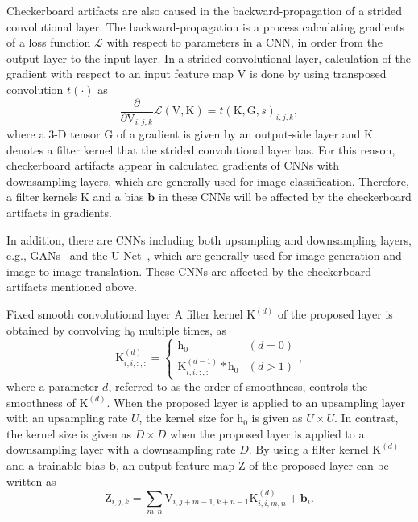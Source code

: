 \documentclass{article}
\makeatletter
\renewcommand\subsection{\@startsection{subsection}{2}{\z@}
                      {0.5ex \@plus 0ex \@minus -2ex}
                      {0.5ex \@plus 0ex}
                      {\normalfont\large\bfseries}}
\newcommand{\myvector}[1]{\boldsymbol{#1}}
\newcommand{\mymatrix}[1]{\mathrm{#1}}
\newcommand{\mytensor}[1]{\boldsymbol{\mathrm{#1}}}
\makeatother
\begin{document}
  Checkerboard artifacts are also caused in the backward-propagation
  of a strided convolutional layer.
  The backward-propagation is
  a process calculating gradients of a loss function $\mathcal{L}$
  with respect to parameters in a CNN, in order from the output layer
  to the input layer.
  In a strided convolutional layer,
  calculation of the gradient with respect to an input feature map $\mytensor{V}$
  is done by using transposed convolution $t(\cdot)$ as
  \begin{equation}
    \frac{\partial}{\partial \mytensor{V}_{i, j, k}} \mathcal{L}(\mytensor{V}, \mytensor{K})
      = t(\mytensor{K}, \mytensor{G}, s)_{i, j, k},
    \label{eq:grad_strided}
  \end{equation}
  where a 3-D tensor $\mytensor{G}$ of a gradient is given by an output-side layer
  and $\mytensor{K}$ denotes a filter kernel that the strided convolutional layer has.
  For this reason,
  checkerboard artifacts appear in calculated gradients
  of CNNs with downsampling layers, which are generally used for image classification.
  Therefore,
  a filter kernels $\mytensor{K}$ and a bias $\myvector{b}$ in
  these CNNs will be affected by the checkerboard artifacts in gradients.

  In addition, there are CNNs including both upsampling and downsampling layers,
  e.g., GANs~\cite{goodfellow2014generative} and the U-Net~\cite{ronneberger2015unet},
  which are generally used for image generation and image-to-image translation.
  These CNNs are affected by the checkerboard artifacts mentioned above.

\subsection{Fixed smooth convolutional layer}
  A filter kernel $\mytensor{K}^{(d)}$ of the proposed layer is obtained
  by convolving $\mymatrix{h}_0$ multiple times, as
  \begin{equation}
    \mytensor{K}^{(d)}_{i, i, :, :} =
    \begin{cases}
      \mymatrix{h}_0 & (d = 0 ) \\
      \mytensor{K}^{(d-1)}_{i, i, :, :} * \mymatrix{h}_0 & (d > 1)
    \end{cases},
  \end{equation}
  where a parameter $d$, referred to as the order of smoothness,
  controls the smoothness of $\mytensor{K}^{(d)}$.
  When the proposed layer is applied to an upsampling layer with an upsampling rate $U$,
  the kernel size for $\mymatrix{h}_0$ is given as $U \times U$.
  In contrast,
  the kernel size is given as $D \times D$
  when the proposed layer is applied to a downsampling layer with a downsampling rate $D$.
  By using a filter kernel $\mytensor{K}^{(d)}$ and a trainable bias $\myvector{b}$,
  an output feature map $\mytensor{Z}$ of the proposed layer
  can be written as
  \begin{equation}
    \mytensor{Z}_{i, j, k} = \sum_{m, n} \mytensor{V}_{i, j+m-1, k+n-1}
                                         \mytensor{K}^{(d)}_{i, i, m, n} + \myvector{b}_i.
  \end{equation}
\end{document}
